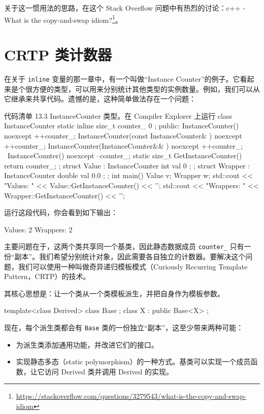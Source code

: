 关于这一惯用法的思路，在这个 Stack Overflow 问题中有热烈的讨论：c++ - What is the copy-and-swap idiom?\footnote{\url{https://stackoverflow.com/questions/3279543/what-is-the-copy-and-swap-idiom}}。

\section{CRTP 类计数器}

在关于 \texttt{inline} 变量的那一章中，有一个叫做“Instance Counter”的例子。它看起来是个很方便的类型，可以用来分别统计其他类型的实例数量。例如，我们可以从它继承来共享代码。遗憾的是，这种简单做法存在一个问题：

\begin{codeboxt}[cpp]{代码清单 13.3 InstanceCounter 类型。在 Compiler Explorer 上运行}
class InstanceCounter {
static inline size_t counter_ { 0 };
public:
InstanceCounter() noexcept { ++counter_; }
InstanceCounter(const InstanceCounter& ) noexcept { ++counter_; }
InstanceCounter(InstanceCounter&& ) noexcept { ++counter_; }
~InstanceCounter() noexcept { --counter_; }
static size_t GetInstanceCounter() { return counter_; }
};
struct Value : InstanceCounter {
int val { 0 };
};
struct Wrapper : InstanceCounter {
double val { 0.0 };
};
int main() {
Value v;
Wrapper w;
std::cout << "Values: " << Value::GetInstanceCounter() << '\n';
std::cout << "Wrappers: " << Wrapper::GetInstanceCounter() << '\n';
}
\end{codeboxt}

运行这段代码，你会看到如下输出：

\begin{codebox}[cpp]
Values: 2
Wrappers: 2
\end{codebox}

主要问题在于，这两个类共享同一个基类，因此静态数据成员 \texttt{counter\_} 只有一份“副本”。我们希望分别统计对象，因此需要各自独立的计数器。要解决这个问题，我们可以使用一种叫做奇异递归模板模式（Curiously Recurring Template Pattern，CRTP）的技术。

其核心思想是：让一个类从一个类模板派生，并把自身作为模板参数。

\begin{codebox}[cpp]
template<class Derived>
class Base {};
class X : public Base<X> {};
\end{codebox}

现在，每个派生类都会有 \texttt{Base} 类的一份独立“副本”，这至少带来两种可能：

\begin{itemize}
\item 为派生类添加通用功能，并改进它们的接口。
\item 实现静态多态（static polymorphism）的一种方式。基类可以实现一个成员函数，让它访问 Derived 类并调用 Derived 的实现。
\end{itemize}


